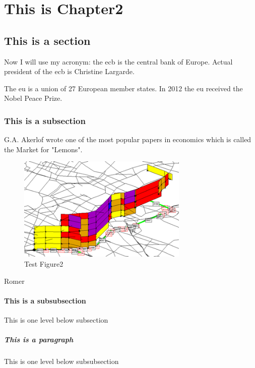\chapter{This is Chapter2}

\lipsum[1]%

\section{This is a section}
Now I will use my acronym: the \gls{ecb} is the central bank of Europe. Actual president of the \gls{ecb} is Christine Largarde.

The \gls{eu} is a union of 27 European member states. In 2012 the \gls{eu} received the Nobel Peace Prize.

\subsection{This is a subsection}
G.A. Akerlof wrote one of the most popular papers in economics which is called the Market for "Lemons"\parencite{akerlof1970}.
\begin{figure}[H] %
    \centering
    \includegraphics[height=50mm]{Images/TestPic.png} %
    \caption{Test Figure2} %
    \label{fig:TestFigure2} %
\end{figure} 

Romer \parencite{romer1990endogenous}

\subsubsection{This is a subsubsection}
This is one level below subsection

\paragraph{This is a paragraph}
This is one level below subsubsection


